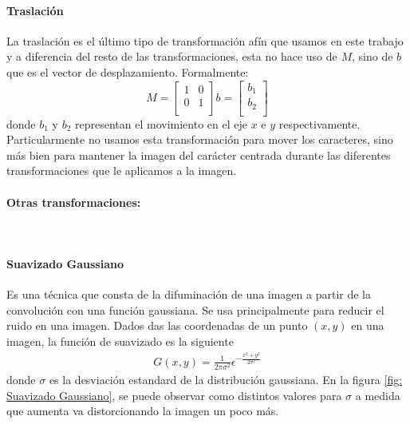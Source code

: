		\paragraph{Traslación}		
			
			La traslación es el último tipo de transformación afín que usamos en este trabajo y a diferencia del resto de las transformaciones, esta no hace uso de $M$, sino de $b$ que es el vector de desplazamiento. Formalmente:
			\begin{equation*}
				M =  
					\begin{bmatrix}
						1 & 0 \\
						0 & 1  \\
					\end{bmatrix}
					b =
					\begin{bmatrix}
						b_1 \\
						b_2 \\
					\end{bmatrix}	
			\end{equation*}
		donde $b_1$ y $b_2$ representan el movimiento en el eje $x$ e $y$ respectivamente. Particularmente no usamos esta transformación para mover los caracteres, sino más bien para mantener la imagen del carácter centrada durante las diferentes transformaciones que le aplicamos a la imagen.
		
		\paragraph{Otras transformaciones:} ~\\
		\paragraph{Suavizado Gaussiano}
		
			Es una técnica que consta de la difuminación de una imagen a partir de la convolución con una función gaussiana. Se usa principalmente para reducir el ruido en una imagen. Dados das las coordenadas de un punto $(x, y)$ en una imagen, la función de suavizado es la siguiente
			\begin{align*}
				G(x,y) = \frac{1}{2\pi\sigma^2}\epsilon^{-\frac{x^2+y^2}{2\sigma^2}}
			\end{align*}
			donde $\sigma$ es la desviación estandard de la distribución gaussiana. En la figura \ref{fig: Suavizado Gaussiano}, se puede observar como distintos valores para $\sigma$ a medida que aumenta va distorcionando la imagen un poco más.
			
